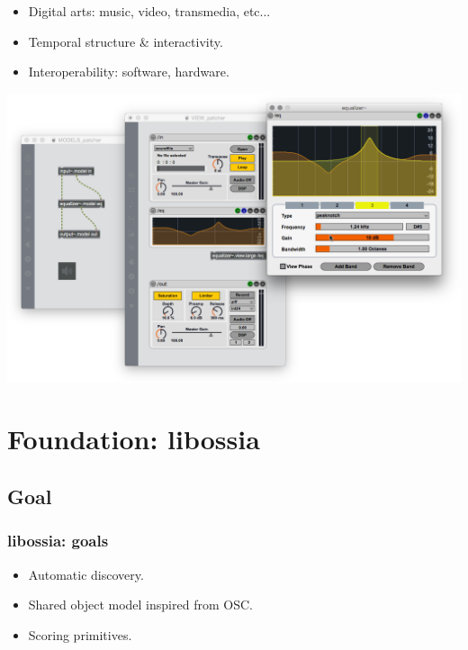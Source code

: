 \documentclass[handout]{beamer}
\begin{document}
\begin{frame}
\Large
\begin{itemize}
    \item Digital arts: music, video, transmedia, etc...
    \item Temporal structure \& interactivity.
    \item Interoperability: software, hardware.
\end{itemize}
\end{frame}

\begin{frame}
\includegraphics[width=\textwidth]{images/jamoma.jpg}
\end{frame}



\section{Foundation: libossia}
\subsection{Goal}

\begin{frame}
\frametitle{libossia: goals}
\Large
\begin{itemize}
    \item Automatic discovery.
    \item Shared object model inspired from OSC.
    \item Scoring primitives.
\end{itemize}
\end{frame}
\end{document}
